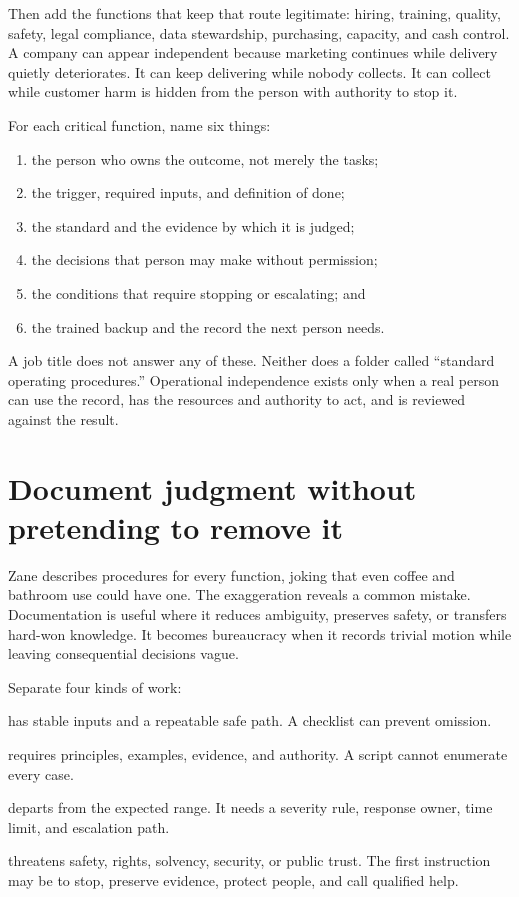 Then add the functions that keep that route legitimate: hiring, training,
quality, safety, legal compliance, data stewardship, purchasing, capacity, and
cash control. A company can appear independent because marketing continues
while delivery quietly deteriorates. It can keep delivering while nobody
collects. It can collect while customer harm is hidden from the person with
authority to stop it.

For each critical function, name six things:

\begin{enumerate}[itemsep=0.12em]
\item the person who owns the outcome, not merely the tasks;
\item the trigger, required inputs, and definition of done;
\item the standard and the evidence by which it is judged;
\item the decisions that person may make without permission;
\item the conditions that require stopping or escalating; and
\item the trained backup and the record the next person needs.
\end{enumerate}

A job title does not answer any of these. Neither does a folder called
``standard operating procedures.'' Operational independence exists only when a
real person can use the record, has the resources and authority to act, and is
reviewed against the result.

\section{Document judgment without pretending to remove it}

Zane describes procedures for every function, joking that even coffee and
bathroom use could have one. The exaggeration reveals a common mistake.
Documentation is useful where it reduces ambiguity, preserves safety, or
transfers hard-won knowledge. It becomes bureaucracy when it records trivial
motion while leaving consequential decisions vague.

Separate four kinds of work:

\begin{description}[leftmargin=2.6em,style=nextline]
\item[Routine] has stable inputs and a repeatable safe path. A checklist can
  prevent omission.
\item[Judgment] requires principles, examples, evidence, and authority. A script
  cannot enumerate every case.
\item[Exception] departs from the expected range. It needs a severity rule,
  response owner, time limit, and escalation path.
\item[Emergency] threatens safety, rights, solvency, security, or public trust.
  The first instruction may be to stop, preserve evidence, protect people, and
  call qualified help.
\end{description}

